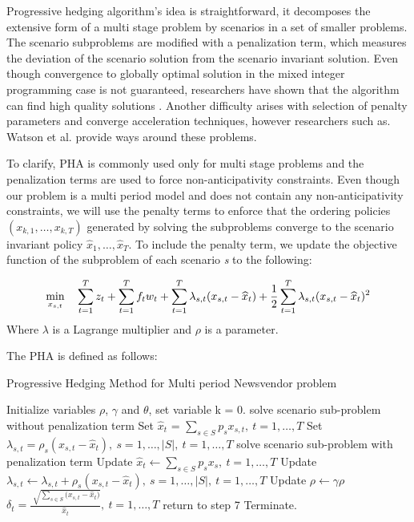 \documentclass[11pt,a4paper]{article}
\begin{document}
Progressive hedging algorithm's idea is straightforward, it decomposes the extensive form of a multi stage problem by scenarios in a set of smaller problems. The scenario subproblems are modified with a penalization term, which measures the deviation of the scenario solution from the scenario invariant solution.
Even though convergence to globally optimal solution in the mixed integer programming case is not guaranteed, researchers have shown that the algorithm can find high quality solutions \cite{gade2016obtaining}. Another difficulty arises with selection of penalty parameters and converge acceleration techniques, however researchers such as. Watson et al. \cite{watson2008progressive} provide ways around these problems.

To clarify, PHA is commonly used only for multi stage problems and the penalization terms are used to force non-anticipativity constraints. Even though our problem is a multi period model and does not contain any non-anticipativity constraints, we will use the penalty terms to enforce that the ordering policies $(x_{k,1},\dots,x_{k,T})$ generated by solving the subproblems converge to the scenario invariant policy $\widehat{x}_{1},\dots,\widehat{x}_{T}$. To include the penalty term, we update the objective function of the subproblem of each scenario \textit{s} to the following:

\begin{equation}
\min_{x_{s,t}} \quad 
\sum\limits_{t=1}^{T}{ z_{t} } + \sum\limits_{t=1}^{T}{f_{t} w_{t} }
+ \sum\limits_{t=1}^{T}{\lambda_{s,t}(x_{s,t} - \widehat{x}_{t})}
+ \frac{1}{2} \sum\limits_{t=1}^{T}{\lambda_{s,t}(x_{s,t} - \widehat{x}_{t})^2}
\\
\end{equation}
Where $\lambda$ is a Lagrange multiplier and $\rho$ is a parameter.

\newpage
The PHA is defined as follows:
\begin{algorithm}
\caption{Progressive Hedging Method for Multi period Newsvendor problem}
\begin{algorithmic}[1]
\State Initialize variables $\rho$, $\gamma$ and $\theta$, set variable k = 0.
\State solve scenario sub-problem without penalization term
      \EndFor
\State
Set $\widehat{x}_{t}$ = $\sum_{s \in S}{p_s x_{s,t}}, \ t=1,\dots, T$
\State Set $\lambda_{s,t} = \rho_{s}(x_{s, t} - \widehat{x}_{t}),  \ s=1,\dots, |S|, \ t=1,\dots, T$ 
\State solve scenario sub-problem with penalization term
      \EndFor
\State
Update $\widehat{x}_{t} \gets \sum_{s \in S}{p_s x_s}, \ t=1,\dots, T$
\State Update $\lambda_{s,t} \gets \lambda_{s,t} + \rho_{s}(x_{s, t} - \widehat{x}_{t}),  \ s=1,\dots, |S|, \ t=1,\dots, T$ 
\State Update $\rho \gets \gamma \rho$
\State $\delta_{t} = \frac{ \sqrt[]{\sum_{s \in S}{(x_{s,t} -\widehat{x}_t})} }{ \widehat{x}_t},\ t = 1,\dots, T$
return to step 7
\EndIf
\EndFor
\State Terminate.
\end{algorithmic}
\end{algorithm}
\end{document}

